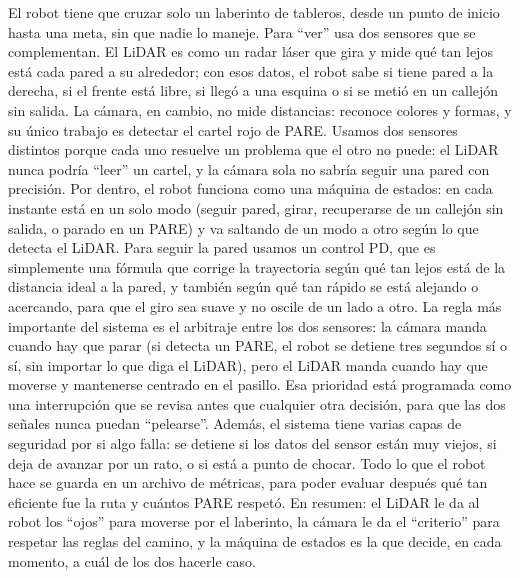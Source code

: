 \documentclass[conference]{IEEEtran}
\begin{document}
El robot tiene que cruzar solo un laberinto de tableros, desde un punto de inicio hasta una meta, sin que nadie lo maneje. Para ``ver'' usa dos sensores que se complementan. El LiDAR es como un radar láser que gira y mide qué tan lejos está cada pared a su alrededor; con esos datos, el robot sabe si tiene pared a la derecha, si el frente está libre, si llegó a una esquina o si se metió en un callejón sin salida. La cámara, en cambio, no mide distancias: reconoce colores y formas, y su único trabajo es detectar el cartel rojo de PARE. Usamos dos sensores distintos porque cada uno resuelve un problema que el otro no puede: el LiDAR nunca podría ``leer'' un cartel, y la cámara sola no sabría seguir una pared con precisión. Por dentro, el robot funciona como una máquina de estados: en cada instante está en un solo modo (seguir pared, girar, recuperarse de un callejón sin salida, o parado en un PARE) y va saltando de un modo a otro según lo que detecta el LiDAR. Para seguir la pared usamos un control PD, que es simplemente una fórmula que corrige la trayectoria según qué tan lejos está de la distancia ideal a la pared, y también según qué tan rápido se está alejando o acercando, para que el giro sea suave y no oscile de un lado a otro. La regla más importante del sistema es el arbitraje entre los dos sensores: la cámara manda cuando hay que parar (si detecta un PARE, el robot se detiene tres segundos sí o sí, sin importar lo que diga el LiDAR), pero el LiDAR manda cuando hay que moverse y mantenerse centrado en el pasillo. Esa prioridad está programada como una interrupción que se revisa antes que cualquier otra decisión, para que las dos señales nunca puedan ``pelearse''. Además, el sistema tiene varias capas de seguridad por si algo falla: se detiene si los datos del sensor están muy viejos, si deja de avanzar por un rato, o si está a punto de chocar. Todo lo que el robot hace se guarda en un archivo de métricas, para poder evaluar después qué tan eficiente fue la ruta y cuántos PARE respetó. En resumen: el LiDAR le da al robot los ``ojos'' para moverse por el laberinto, la cámara le da el ``criterio'' para respetar las reglas del camino, y la máquina de estados es la que decide, en cada momento, a cuál de los dos hacerle caso.



\end{document}
